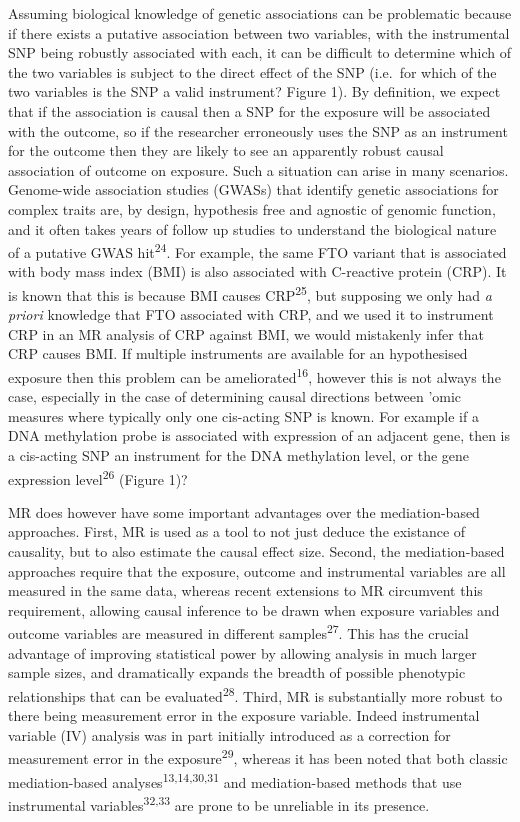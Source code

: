 \documentclass[]{article}
\begin{document}
Assuming biological knowledge of genetic associations can be problematic
because if there exists a putative association between two variables,
with the instrumental SNP being robustly associated with each, it can be
difficult to determine which of the two variables is subject to the
direct effect of the SNP (i.e.~for which of the two variables is the SNP
a valid instrument? Figure 1). By definition, we expect that if the
association is causal then a SNP for the exposure will be associated
with the outcome, so if the researcher erroneously uses the SNP as an
instrument for the outcome then they are likely to see an apparently
robust causal association of outcome on exposure. Such a situation can
arise in many scenarios. Genome-wide association studies (GWASs) that
identify genetic associations for complex traits are, by design,
hypothesis free and agnostic of genomic function, and it often takes
years of follow up studies to understand the biological nature of a
putative GWAS hit\textsuperscript{24}. For example, the same FTO variant
that is associated with body mass index (BMI) is also associated with
C-reactive protein (CRP). It is known that this is because BMI causes
CRP\textsuperscript{25}, but supposing we only had \emph{a priori}
knowledge that FTO associated with CRP, and we used it to instrument CRP
in an MR analysis of CRP against BMI, we would mistakenly infer that CRP
causes BMI. If multiple instruments are available for an hypothesised
exposure then this problem can be ameliorated\textsuperscript{16},
however this is not always the case, especially in the case of
determining causal directions between 'omic measures where typically
only one cis-acting SNP is known. For example if a DNA methylation probe
is associated with expression of an adjacent gene, then is a cis-acting
SNP an instrument for the DNA methylation level, or the gene expression
level\textsuperscript{26} (Figure 1)?

MR does however have some important advantages over the mediation-based
approaches. First, MR is used as a tool to not just deduce the existance
of causality, but to also estimate the causal effect size. Second, the
mediation-based approaches require that the exposure, outcome and
instrumental variables are all measured in the same data, whereas recent
extensions to MR circumvent this requirement, allowing causal inference
to be drawn when exposure variables and outcome variables are measured
in different samples\textsuperscript{27}. This has the crucial advantage
of improving statistical power by allowing analysis in much larger
sample sizes, and dramatically expands the breadth of possible
phenotypic relationships that can be evaluated\textsuperscript{28}.
Third, MR is substantially more robust to there being measurement error
in the exposure variable. Indeed instrumental variable (IV) analysis was
in part initially introduced as a correction for measurement error in
the exposure\textsuperscript{29}, whereas it has been noted that both
classic mediation-based analyses\textsuperscript{13,14,30,31} and
mediation-based methods that use instrumental
variables\textsuperscript{32,33} are prone to be unreliable in its
presence.
\end{document}
